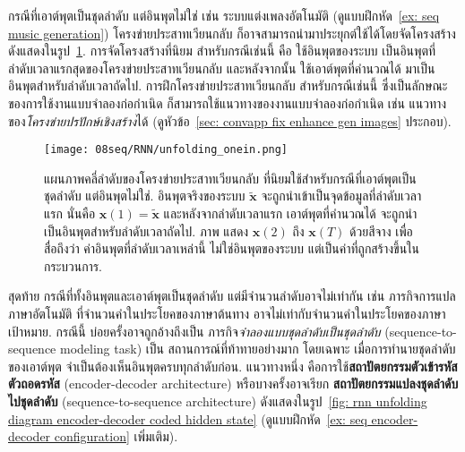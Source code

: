 กรณีที่เอาต์พุตเป็นชุดลำดับ แต่อินพุตไม่ใช่ เช่น ระบบแต่งเพลงอัตโนมัติ (ดูแบบฝึกหัด~\ref{ex: seq music generation})
โครงข่ายประสาทเวียนกลับ ก็อาจสามารถนำมาประยุกต์ใช้ได้โดยจัดโครงสร้างดังแสดงในรูป~\ref{fig: rnn unfolding diagram one to many}.
การจัดโครงสร้างที่นิยม สำหรับกรณีเช่นนี้ 
คือ ใช้อินพุตของระบบ เป็นอินพุตที่ลำดับเวลาแรกสุดของโครงข่ายประสาทเวียนกลับ 
และหลังจากนั้น ใช้เอาต์พุตที่คำนวณได้ มาเป็นอินพุตสำหรับลำดับเวลาถัดไป.	
การฝึกโครงข่ายประสาทเวียนกลับ สำหรับกรณีเช่นนี้ ซึ่งเป็นลักษณะของการใช้งานแบบจำลองก่อกำเนิด
ก็สามารถใช้แนวทางของงานแบบจำลองก่อกำเนิด เช่น แนวทางของ\textit{โครงข่ายปรปักษ์เชิงสร้าง}ได้ (ดูหัวข้อ~\ref{sec: convapp fix enhance gen images} ประกอบ). 	

\begin{figure}
	\begin{center}		
		\texttt{[image: 08seq/RNN/unfolding\_onein.png]}	
		\caption[แผนภาพคลี่ลำดับ กรณีที่อินพุตไม่ใช่ชุดลำดับ]{แผนภาพคลี่ลำดับของโครงข่ายประสาทเวียนกลับ ที่นิยมใช้สำหรับกรณีที่เอาต์พุตเป็นชุดลำดับ แต่อินพุตไม่ใช่.
			อินพุตจริงของระบบ $\tilde{\bm{x}}$ จะถูกนำเข้าเป็นจุดข้อมูลที่ลำดับเวลาแรก นั่นคือ $\bm{x}(1) = \tilde{\bm{x}}$
			และหลังจากลำดับเวลาแรก เอาต์พุตที่คำนวณได้ จะถูกนำเป็นอินพุตสำหรับลำดับเวลาถัดไป.	
			ภาพ	แสดง $\bm{x}(2)$ ถึง $\bm{x}(T)$ ด้วยสีจาง เพื่อสื่อถึงว่า ค่าอินพุตที่ลำดับเวลาเหล่านี้ ไม่ใช่อินพุตของระบบ แต่เป็นค่าที่ถูกสร้างขึ้นในกระบวนการ. 
		}
		\label{fig: rnn unfolding diagram one to many}
	\end{center}
\end{figure}
%

สุดท้าย
กรณีที่ทั้งอินพุตและเอาต์พุตเป็นชุดลำดับ แต่มีจำนวนลำดับอาจไม่เท่ากัน 
เช่น ภารกิจการแปลภาษาอัตโนมัติ
ที่จำนวนคำในประโยคของภาษาต้นทาง อาจไม่เท่ากับจำนวนคำในประโยคของภาษาเป้าหมาย.
กรณีนี้ บ่อยครั้งอาจถูกอ้างถึงเป็น ภารกิจ\textit{จำลองแบบชุดลำดับเป็นชุดลำดับ} (sequence-to-sequence modeling task)
เป็น สถานการณ์ที่ท้าทายอย่างมาก โดยเฉพาะ เมื่อการทำนายชุดลำดับของเอาต์พุต จำเป็นต้องเห็นอินพุตครบทุกลำดับก่อน.
แนวทางหนึ่ง คือการใช้\textbf{สถาปัตยกรรมตัวเข้ารหัสตัวถอดรหัส} (encoder-decoder architecture\cite{ChoEtAl2014a})
หรือบางครั้งอาจเรียก \textbf{สถาปัตยกรรมแปลงชุดลำดับไปชุดลำดับ} (sequence-to-sequence architecture\cite{SutskeverEtAl2014})
ดังแสดงในรูป~\ref{fig: rnn unfolding diagram encoder-decoder coded hidden state}
(ดูแบบฝึกหัด~\ref{ex: seq encoder-decoder configuration} เพิ่มเติม).

